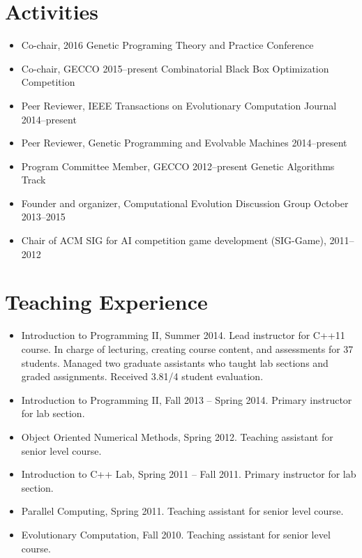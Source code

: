 \documentclass[a4paper,11pt]{article}
\begin{document}
\section{Activities}
\begin{itemize}
\item     Co-chair, 2016 Genetic Programing Theory and Practice Conference
\item     Co-chair, GECCO 2015--present Combinatorial Black Box Optimization Competition
\item     Peer Reviewer, IEEE Transactions on Evolutionary Computation Journal 2014--present
\item     Peer Reviewer, Genetic Programming and Evolvable Machines 2014--present
\item     Program Committee Member, GECCO 2012--present Genetic Algorithms Track
\item     Founder and organizer, Computational Evolution Discussion Group October 2013--2015
\item     Chair of ACM SIG for AI competition game development (SIG-Game), 2011--2012
\end{itemize}

\section{Teaching Experience}
\begin{itemize}
\item Introduction to Programming II, Summer 2014.
      Lead instructor for C++11 course. In charge of lecturing, creating course content, and assessments
      for 37 students. Managed two graduate assistants who taught lab sections and graded assignments.
      Received 3.81/4 student evaluation.
\item Introduction to Programming II, Fall 2013 -- Spring 2014. Primary instructor for lab section.
\item Object Oriented Numerical Methods, Spring 2012. Teaching assistant for senior level course.
\item Introduction to C++ Lab, Spring 2011 -- Fall 2011. Primary instructor for lab section.
\item Parallel Computing, Spring 2011. Teaching assistant for senior level course.
\item Evolutionary Computation, Fall 2010. Teaching assistant for senior level course.
\end{itemize}
\end{document}
